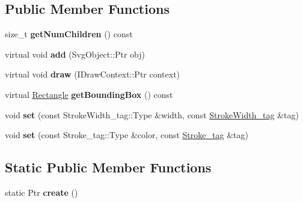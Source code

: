 \subsection*{Public Member Functions}
\begin{DoxyCompactItemize}
\item 
\hypertarget{classsambag_1_1disco_1_1svg_1_1_svg_compound_ab97cedaf15e20a3dbe8530e0baf95d43}{
size\_\-t {\bfseries getNumChildren} () const }
\label{classsambag_1_1disco_1_1svg_1_1_svg_compound_ab97cedaf15e20a3dbe8530e0baf95d43}

\item 
\hypertarget{classsambag_1_1disco_1_1svg_1_1_svg_compound_adea06ff47c94f6ef3dfafa09e63c6df5}{
virtual void {\bfseries add} (SvgObject::Ptr obj)}
\label{classsambag_1_1disco_1_1svg_1_1_svg_compound_adea06ff47c94f6ef3dfafa09e63c6df5}

\item 
\hypertarget{classsambag_1_1disco_1_1svg_1_1_svg_compound_a8e81a118a56bba814020938288c4dce3}{
virtual void {\bfseries draw} (IDrawContext::Ptr context)}
\label{classsambag_1_1disco_1_1svg_1_1_svg_compound_a8e81a118a56bba814020938288c4dce3}

\item 
\hypertarget{classsambag_1_1disco_1_1svg_1_1_svg_compound_a3a133a2b00b8161750722992ccf8235d}{
virtual \hyperlink{classsambag_1_1com_1_1_rectangle}{Rectangle} {\bfseries getBoundingBox} () const }
\label{classsambag_1_1disco_1_1svg_1_1_svg_compound_a3a133a2b00b8161750722992ccf8235d}

\item 
\hypertarget{classsambag_1_1disco_1_1svg_1_1_svg_compound_a06d0c970a84d2ea4daa5074bd3e2196a}{
void {\bfseries set} (const StrokeWidth\_\-tag::Type \&width, const \hyperlink{structsambag_1_1disco_1_1svg_1_1_svg_object_1_1_stroke_width__tag}{StrokeWidth\_\-tag} \&tag)}
\label{classsambag_1_1disco_1_1svg_1_1_svg_compound_a06d0c970a84d2ea4daa5074bd3e2196a}

\item 
\hypertarget{classsambag_1_1disco_1_1svg_1_1_svg_compound_af2a6a7aa2df170727aa94014d976df55}{
void {\bfseries set} (const Stroke\_\-tag::Type \&color, const \hyperlink{structsambag_1_1disco_1_1svg_1_1_svg_object_1_1_stroke__tag}{Stroke\_\-tag} \&tag)}
\label{classsambag_1_1disco_1_1svg_1_1_svg_compound_af2a6a7aa2df170727aa94014d976df55}

\end{DoxyCompactItemize}
\subsection*{Static Public Member Functions}
\begin{DoxyCompactItemize}
\item 
\hypertarget{classsambag_1_1disco_1_1svg_1_1_svg_compound_ada54b80d89a9f70b36b519cfac1e510e}{
static Ptr {\bfseries create} ()}
\label{classsambag_1_1disco_1_1svg_1_1_svg_compound_ada54b80d89a9f70b36b519cfac1e510e}

\end{DoxyCompactItemize}

